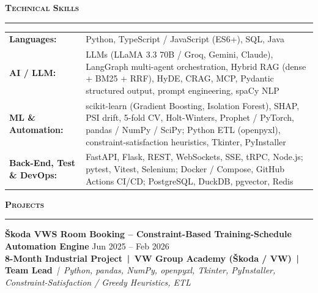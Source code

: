 \documentclass[a4paper,10pt]{article}
\newcommand{\sectionHeader}[2]{%
  \vspace{1.5pt}%
  \noindent%
  {\normalsize\bfseries\color{HeaderDark}#2\enspace\textsc{#1}}%
  \\[-6pt]%
  {\color{SectionLine}\rule{\textwidth}{1pt}}%
  \vspace{1pt}\par%
}
\newcommand{\projectEntry}[4]{%
  \vspace{1pt}%
  \noindent\textbf{\color{HeaderDark}#1} \hfill {\small\color{SubText}#2}\\[-4pt]%
  {\scriptsize\color{AccentTeal}\textbf{#3}} {\scriptsize\color{TechTag}\textit{\,|\, #4}}%
  \vspace{0pt}\par%
}
\begin{document}

\sectionHeader{Technical Skills}{\faCogs}

\vspace{1pt}
\begin{tabularx}{\textwidth}{@{}l X@{}}
  {\small\textbf{\color{HeaderDark}Languages:}} & {\small Python, TypeScript / JavaScript (ES6+), SQL, Java} \\[2pt]
  {\small\textbf{\color{HeaderDark}AI / LLM:}} & {\small LLMs (LLaMA 3.3 70B / Groq, Gemini, Claude), LangGraph multi-agent orchestration, Hybrid RAG (dense + BM25 + RRF), HyDE, CRAG, MCP, Pydantic structured output, prompt engineering, spaCy NLP} \\[2pt]
  {\small\textbf{\color{HeaderDark}ML \& Automation:}} & {\small scikit-learn (Gradient Boosting, Isolation Forest), SHAP, PSI drift, 5-fold CV, Holt-Winters, Prophet / PyTorch, pandas / NumPy / SciPy; Python ETL (openpyxl), constraint-satisfaction heuristics, Tkinter, PyInstaller} \\[2pt]
  {\small\textbf{\color{HeaderDark}Back-End, Test \& DevOps:}} & {\small FastAPI, Flask, REST, WebSockets, SSE, tRPC, Node.js; pytest, Vitest, Selenium; Docker / Compose, GitHub Actions CI/CD; PostgreSQL, DuckDB, pgvector, Redis} \\
\end{tabularx}


\sectionHeader{Projects}{\faProjectDiagram}

\projectEntry{\v{S}koda VWS Room Booking -- Constraint-Based Training-Schedule Automation Engine}
  {Jun 2025 -- Feb 2026}
  {8-Month Industrial Project \,|\, VW Group Academy (\v{S}koda / VW) \,|\, Team Lead}
  {Python, pandas, NumPy, openpyxl, Tkinter, PyInstaller, Constraint-Satisfaction / Greedy Heuristics, ETL}
\end{document}
